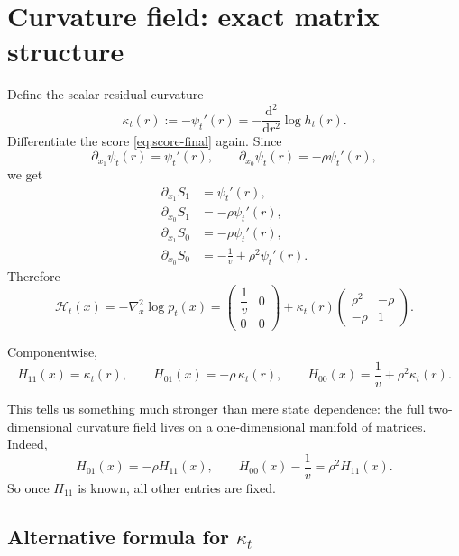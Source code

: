 \documentclass[11pt]{article}
\newcommand{\dd}{\mathrm{d}}
\newcommand{\1}{\mathbf{1}}
\newcommand{\pt}{p_t}
\newcommand{\curv}{\mathcal{H}}
\theoremstyle{definition}
\begin{document}
\section{Curvature field: exact matrix structure}

Define the scalar residual curvature
\begin{equation}
\label{eq:kappa-definition}
\kappa_t(r):=-\psi_t'(r)=-\frac{\dd^2}{\dd r^2}\log h_t(r).
\end{equation}
Differentiate the score \eqref{eq:score-final} again. Since
\begin{equation}
\partial_{x_1}\psi_t(r)=\psi_t'(r),
\qquad
\partial_{x_0}\psi_t(r)=-\rho\psi_t'(r),
\end{equation}
we get
\begin{align}
\partial_{x_1} S_1 &= \psi_t'(r), \\
\partial_{x_0} S_1 &= -\rho\psi_t'(r), \\
\partial_{x_1} S_0 &= -\rho\psi_t'(r), \\
\partial_{x_0} S_0 &= -\frac{1}{v}+\rho^2\psi_t'(r).
\end{align}
Therefore
\begin{equation}
\label{eq:hessian-final}
\boxed{
\curv_t(x)= -\nabla_x^2 \log \pt(x)
=
\begin{pmatrix}
\dfrac{1}{v} & 0\\[0.6em]
0 & 0
\end{pmatrix}
+
\kappa_t(r)
\begin{pmatrix}
\rho^2 & -\rho\\[0.4em]
-\rho & 1
\end{pmatrix}.
}
\end{equation}

Componentwise,
\begin{equation}
\label{eq:hessian-components}
\boxed{
H_{11}(x)=\kappa_t(r),
\qquad
H_{01}(x)=-\rho\,\kappa_t(r),
\qquad
H_{00}(x)=\frac{1}{v}+\rho^2\kappa_t(r).
}
\end{equation}

This tells us something much stronger than mere state dependence: the full two-dimensional curvature field lives on a one-dimensional manifold of matrices. Indeed,
\begin{equation}
H_{01}(x)=-\rho H_{11}(x),
\qquad
H_{00}(x)-\frac{1}{v}=\rho^2 H_{11}(x).
\end{equation}
So once \(H_{11}\) is known, all other entries are fixed.

\subsection{Alternative formula for \(\kappa_t\)}
\end{document}
